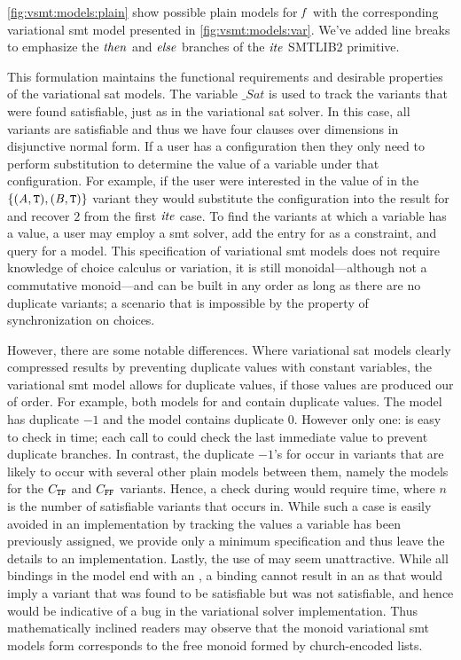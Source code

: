 \autoref{fig:vsmt:models:plain} show possible plain models for $\mathit{f}$ with the
corresponding variational \ac{smt} model presented in
\autoref{fig:vsmt:models:var}. We've added line breaks to emphasize the
$\mathit{then}$ and $\mathit{else}$ branches of the $\mathit{ite}$ SMTLIB2 primitive.

This formulation maintains the functional requirements and desirable properties
of the variational \ac{sat} models. The variable $\_Sat$ is used to track the
variants that were found satisfiable, just as in the variational \ac{sat}
solver. In this case, all variants are satisfiable and thus we have four clauses
over dimensions in disjunctive normal form. If a user has a configuration then
they only need to perform substitution to determine the value of a variable
under that configuration. For example, if the user were interested in the value
of \iV{} in the $\{(\mathit{A}{}, \texttt{T}{}), (\mathit{B}{}, \texttt{T}{})\}$ variant they would
substitute the configuration into the result for \iV{} and recover $2$ from the
first $\mathit{ite}$ case. To find the variants at which a variable has a value, a
user may employ a \ac{smt} solver, add the entry for \iV{} as a constraint, and
query for a model.
%
This specification of variational \ac{smt} models does not require knowledge of
choice calculus or variation, it is still monoidal---although not a commutative
monoid---and can be built in any order as long as there are no duplicate
variants; a scenario that is impossible by the property of synchronization on
choices.


However, there are some notable differences. Where variational \ac{sat} models
clearly compressed results by preventing duplicate values with constant
variables, the variational \ac{smt} model allows for duplicate values, if those
values are produced our of order. For example, both models for \iV{} and \cV{}
contain duplicate values. The \iV{} model has duplicate $-1$ and the \cV{} model
contains duplicate $0$. However only one: \cV{} is easy to check in 
time; each call to  could check the last immediate value to prevent
duplicate branches. In contrast, the duplicate $-1$'s for \iV{} occur in
variants that are likely to occur with several other plain models between them,
namely the models for the $C_{\texttt{T}\texttt{F}}$ and $C_{\texttt{F}\texttt{F}}$ variants. Hence, a
check during  would require  time, where $n$ is the number
of satisfiable variants that \iV{} occurs in. While such a case is easily
avoided in an implementation by tracking the values a variable has been
previously assigned, we provide only a minimum specification and thus leave the
details to an implementation.
%
Lastly, the use of \undefined{} may seem unattractive. While all bindings in the
model end with an \undefined{}, a binding cannot result in an \undefined{} as
that would imply a variant that was found to be satisfiable but was not
satisfiable, and hence would be indicative of a bug in the variational solver
implementation. Thus mathematically inclined readers may observe that the monoid
variational \ac{smt} models form corresponds to the free monoid formed by
church-encoded lists.

